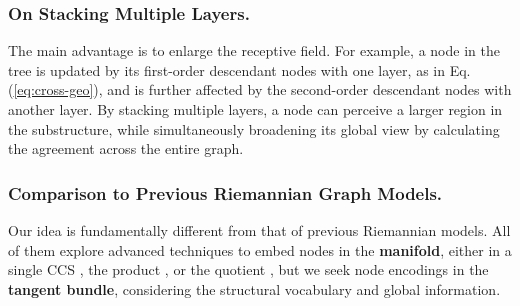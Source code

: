
        \vspace{-0.05in}
\subsubsection*{\textbf{On Stacking Multiple Layers.}}
The main advantage is to enlarge the receptive field.
For example, a node in the tree is updated by its first-order descendant nodes with one layer, as in Eq. (\ref{eq:cross-geo}),
and is further affected by the second-order descendant nodes with another layer.
By stacking multiple layers, a node can perceive a larger region in the substructure, 
while simultaneously broadening its global view by calculating the agreement across the entire graph.

        \vspace{-0.05in}
\subsubsection*{\textbf{Comparison to Previous Riemannian Graph Models.}}
Our idea is fundamentally different from that of previous Riemannian models.
All of them explore advanced techniques to embed nodes in the \textbf{manifold}, either in a single CCS \cite{icml20Constant}, the product \cite{iclr19mixCurvature,iclr23lantentGraphProduct}, or the quotient \cite{nips21UltraNN,nips22QGCN},
but we seek node encodings in the \textbf{tangent bundle}, considering the structural vocabulary and global information.




